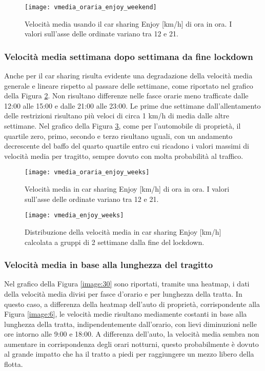 \begin{figure}[H]
	\centering
	\texttt{[image: vmedia\_oraria\_enjoy\_weekend]}
	\caption{Velocità media usando il car sharing Enjoy [km/h] di ora in ora. I valori sull'asse delle ordinate variano tra 12 e 21.}
	\label{image:20}
\end{figure}

\subsubsection{Velocità media settimana dopo settimana da fine lockdown}

Anche per il car sharing risulta evidente una degradazione della velocità media generale e lineare rispetto al passare delle settimane, come riportato nel grafico della Figura \ref{image:16}. Non risultano differenze nelle fasce orarie meno trafficate dalle 12:00 alle 15:00 e dalle 21:00 alle 23:00. Le prime due settimane dall'allentamento delle restrizioni risultano più veloci di circa 1 km/h di media dalle altre settimane. Nel grafico della Figura \ref{image:28}, come per l'automobile di proprietà, il quartile zero, primo, secondo e terzo risultano uguali, con un andamento decrescente del baffo del quarto quartile entro cui ricadono i valori massimi di velocità media per tragitto, sempre dovuto con molta probabilità al traffico.

\begin{figure}[H]
	\centering
	\texttt{[image: vmedia\_oraria\_enjoy\_weeks]}
	\caption{Velocità media in car sharing Enjoy [km/h] di ora in ora. I valori sull'asse delle ordinate variano tra 12 e 21.}
	\label{image:16}
\end{figure}

\begin{figure}
	\centering
	\texttt{[image: vmedia\_enjoy\_weeks]}
	\caption{Distribuzione della velocità media in car sharing Enjoy [km/h] calcolata a gruppi di 2 settimane dalla fine del lockdown.}
	\label{image:28}
\end{figure}

\subsubsection{Velocità media in base alla lunghezza del tragitto}

Nel grafico della Figura \ref{image:30} sono riportati, tramite una heatmap, i dati della velocità media divisi per fasce d'orario e per lunghezza della tratta. In questo caso, a differenza della heatmap dell'auto di proprietà, corrispondente alla Figura \ref{image:6}, le velocità medie risultano mediamente costanti in base alla lunghezza della tratta, indipendentemente dall'orario, con lievi diminuzioni nelle ore intorno alle 9:00 e 18:00. A differenza dell'auto, la velocità media sembra non aumentare in corrispondenza degli orari notturni, questo probabilmente è dovuto al grande impatto che ha il tratto a piedi per raggiungere un mezzo libero della flotta.

